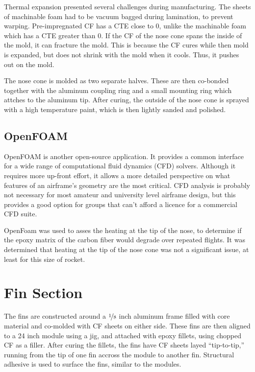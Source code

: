 \documentclass{aiaa-tc}%
\begin{document}
Thermal expansion presented several challenges during manufacturing. 
The sheets of machinable foam had to be vacuum bagged during lamination, to prevent warping.
Pre-impregnated CF has a CTE close to 0, unlike the machinable foam which has a CTE greater than 0. 
If the CF of the nose cone spans the inside of the mold, it can fracture the mold. 
This is because the CF cures while then mold is expanded, but does not shrink with the mold when it cools. Thus, it pushes out on the mold. 

The nose cone is molded as two separate halves. These are then co-bonded together with the aluminum coupling ring and a small mounting ring which attches to the aluminum tip.
After curing, the outside of the nose cone is sprayed with a high temperature paint, which is then lightly sanded and polished.

\subsection{OpenFOAM}
OpenFOAM is another open-source application. It provides a common interface for a wide range of computational fluid dynamics (CFD) solvers.
Although it requires more up-front effort, it allows a more detailed perspective on what features of an airframe's geometry are the most critical. 
CFD analysis is probably not necessary for most amateur and university level airframe design, but this provides a good option for groups that can't afford a licence for a commercial CFD suite. 

OpenFoam was used to asses the heating at the tip of the nose, to determine if the epoxy matrix of the carbon fiber would degrade over repeated flights.
It was determined that heating at the tip of the nose cone was not a significant issue, at least for this size of rocket.

\section{Fin Section}

The fins are constructed around a $\nicefrac{1}{8}$ inch aluminum frame filled with core material and co-molded with CF sheets on either side. 
These fins are then aligned to a 24 inch module using a jig, and attached with epoxy fillets, using chopped CF as a filler. 
After curing the fillets, the fins have CF sheets layed ``tip-to-tip,'' running from the tip of one fin accross the module to another fin. 
Structural adhesive is used to surface the fins, similar to the modules. 
\end{document}
